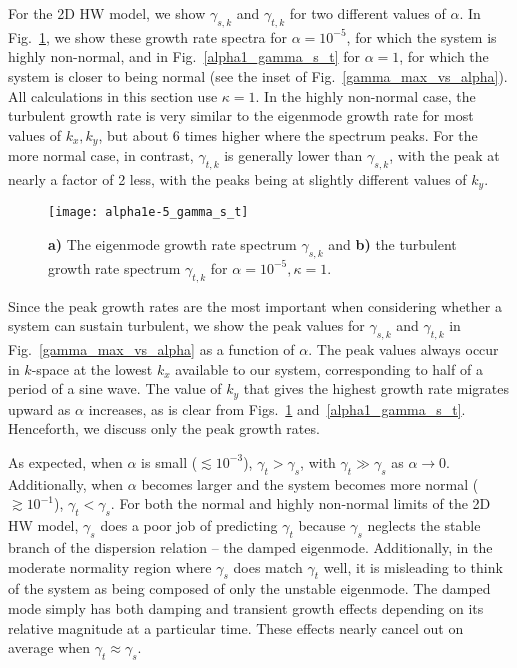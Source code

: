 \documentclass[twocolumn,showkeys,superscriptaddress]{revtex4}
\begin{document}
For the 2D HW model, we show
$\gamma_{s,k}$ and $\gamma_{t,k}$ for two different values of $\alpha$. In Fig.~\ref{alpha1e-5_gamma_s_t}, we show these growth rate spectra for $\alpha = 10^{-5}$, for which the system is
highly non-normal, and in Fig.~\ref{alpha1_gamma_s_t} for $\alpha = 1$, for which the system is closer to being normal (see the inset of Fig.~\ref{gamma_max_vs_alpha}). All calculations in this section use $\kappa=1$. 
In the highly non-normal case, the turbulent growth rate is very similar to the eigenmode growth rate for most values of $k_x,k_y$, but about 6 times higher where the spectrum peaks. For the more normal
case, in contrast, $\gamma_{t,k}$ is generally lower than $\gamma_{s,k}$, with the peak at nearly a factor of 2 less, with the peaks being at slightly different values of $k_y$.
\begin{figure}
\centerline{\texttt{[image: alpha1e-5\_gamma\_s\_t]}}
\caption{{\bf a)} The eigenmode growth rate spectrum $\gamma_{s,k}$ and {\bf b)} the turbulent growth rate spectrum $\gamma_{t,k}$ for $\alpha = 10^{-5}, \kappa=1$.}
\label{alpha1e-5_gamma_s_t}
\end{figure}

Since the peak growth rates are the most important when considering whether a system can sustain turbulent, we show the peak values for $\gamma_{s,k}$ and $\gamma_{t,k}$ in Fig.~\ref{gamma_max_vs_alpha} as a function of $\alpha$. 
The peak values always occur in $k$-space at the lowest $k_x$ available to our system, corresponding to half of a period of a sine wave. The value of $k_y$ that gives the highest growth rate migrates upward as $\alpha$ increases,
as is clear from Figs.~\ref{alpha1e-5_gamma_s_t} and~\ref{alpha1_gamma_s_t}. Henceforth, we discuss only the peak growth rates.

As expected, when $\alpha$ is small ($\lesssim 10^{-3}$), $\gamma_{t} > \gamma_{s}$, with
$\gamma_{t} \gg \gamma_{s}$ as $\alpha \to 0$. Additionally, when $\alpha$ becomes larger and the system becomes more normal ($\gtrsim 10^{-1}$), $\gamma_{t} < \gamma_{s}$.
For both the normal and highly non-normal limits of the 2D HW model, $\gamma_{s}$ does a poor job of predicting $\gamma_{t}$ because $\gamma_{s}$ neglects the stable branch of the
dispersion relation -- the damped eigenmode. Additionally, in the moderate normality region where $\gamma_{s}$ does match $\gamma_{t}$ well, it is misleading to think of the system as being composed of only the
unstable eigenmode. The damped mode simply has both damping and transient growth effects depending on its relative magnitude at a particular time. These effects nearly cancel out on average when $\gamma_{t} \approx \gamma_{s}$.
\end{document}
